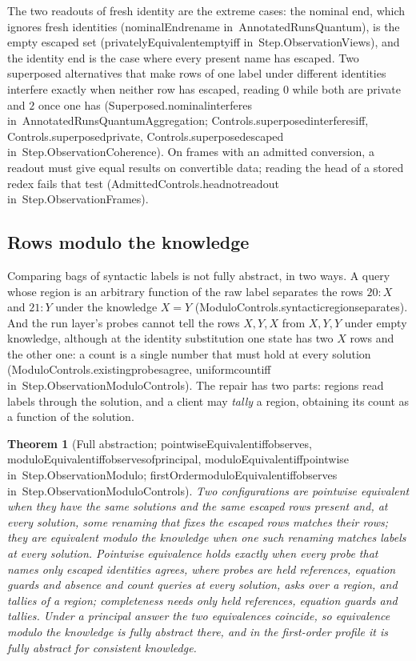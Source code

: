 \documentclass[11pt]{article}
\newtheorem{theorem}{Theorem}
\theoremstyle{remark}
\newcommand{\lean}[1]{{\ttfamily\def\_{\textunderscore\allowbreak}#1}}
\newcommand{\inmod}[1]{in~{\ttfamily\def\_{\textunderscore\allowbreak}#1}}
\begin{document}
The two readouts of fresh identity are the extreme cases: the nominal end, which ignores fresh
identities (\lean{nominalEnd\_rename} \inmod{AnnotatedRunsQuantum}), is the empty escaped set
(\lean{privatelyEquivalent\_empty\_iff} \inmod{Step.ObservationViews}), and the
identity end is the case where every present name has escaped. Two superposed alternatives that make
rows of one label under different identities interfere exactly when neither row has escaped, reading
$0$ while both are private and $2$ once one has (\lean{Superposed.nominal\_interferes}
\inmod{AnnotatedRunsQuantumAggregation}; \lean{Controls.superposed\_interferes\_iff},
\lean{Controls.superposed\_private}, \lean{Controls.superposed\_escaped} \inmod{Step.ObservationCoherence}). On
frames with an admitted conversion, a readout must give equal results on convertible data; reading the
head of a stored redex fails that test (\lean{AdmittedControls.head\_not\_readout} \inmod{Step.ObservationFrames}).

\subsection{Rows modulo the knowledge}

Comparing bags of syntactic labels is not fully abstract, in two ways. A query whose region is an
arbitrary function of the raw label separates the rows $20 : X$ and $21 : Y$ under the knowledge $X = Y$
(\lean{ModuloControls.syntactic\_region\_separates}). And the run layer's probes cannot tell the rows $X, Y,
X$ from $X, Y, Y$ under empty knowledge, although at the identity substitution one state has two $X$
rows and the other one: a count is a single number that must hold at every solution
(\lean{ModuloControls.existing\_probes\_agree}, \lean{uniform\_count\_iff} \inmod{Step.ObservationModuloControls}).
The repair has two parts: regions read labels through the solution, and a client may \emph{tally} a
region, obtaining its count as a function of the solution.

\begin{theorem}[Full abstraction; \lean{pointwiseEquivalent\_iff\_observes}, \lean{moduloEquivalent\_iff\_observes\_of\_principal}, \lean{moduloEquivalent\_iff\_pointwise} \inmod{Step.ObservationModulo}; \lean{firstOrder\_moduloEquivalent\_iff\_observes} \inmod{Step.ObservationModuloControls}]
Two configurations are \emph{pointwise equivalent} when they have the same solutions and the same
escaped rows present and, at every solution, some renaming that fixes the escaped rows matches their
rows; they are \emph{equivalent modulo the knowledge} when one such renaming matches labels at every
solution. Pointwise equivalence holds exactly when every probe that names only escaped identities
agrees, where probes are held references, equation guards and absence and count queries at every
solution, asks over a region, and tallies of a region; completeness needs only held references,
equation guards and tallies. Under a principal answer the two equivalences coincide, so equivalence
modulo the knowledge is fully abstract there, and in the first-order profile it is fully abstract for
consistent knowledge.
\end{theorem}
\end{document}
